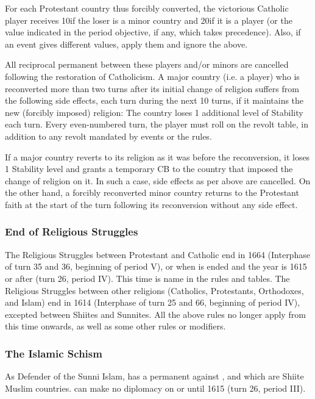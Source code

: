 For each Protestant country thus forcibly converted, the victorious Catholic
player receives 10\VP if the loser is a minor country and 20\VP if it is a
player (or the value indicated in the period objective, if any, which takes
precedence).  Also, if an event gives different values, apply them and ignore
the above.

All reciprocal permanent \CB between these players and/or minors are cancelled
following the restoration of Catholicism.  A major country (i.e. a player) who
is reconverted more than two turns after its initial change of religion
suffers from the following side effects, each turn during the next 10 turns,
if it maintains the new (forcibly imposed) religion:
\bparag The country loses 1 additional level of Stability each turn.
\bparag Every even-numbered turn, the player must roll on the revolt table, in
addition to any revolt mandated by events or the rules.

\bparag If a major country reverts to its religion as it was before the
reconversion, it loses 1 Stability level and grants a temporary CB to the
country that imposed the change of religion on it. In such a case, side
effects as per above are cancelled.
\bparag On the other hand, a forcibly reconverted minor country returns to the
Protestant faith at the start of the turn following its reconversion without
any side effect.


\subsubsection{End of Religious Struggles}
\aparag The Religious Struggles between Protestant and Catholic end in 1664
(Interphase of turn 35 and 36, beginning of period V), or when
 is ended and the year is 1615 or after (turn 26, period
IV). This time is name  in the rules and
tables.
\aparag The Religious Struggles between other religions (Catholics,
Protestants, Orthodoxes, and Islam) end in 1614 (Interphase of turn 25 and 66,
beginning of period IV), excepted between Shiites and Sunnites.
\aparag All the above rules no longer apply from this time onwards, as well as
some other rules or modifiers.


\subsubsection{The Islamic Schism}\label{chSpecific:Islam}
\aparag As Defender of the Sunni Islam, \TUR has a permanent \CB against
,  and  which are Shiite Muslim
countries.
\aparag \TUR can make no diplomacy on  or  until 1615
(turn 26, period III).

